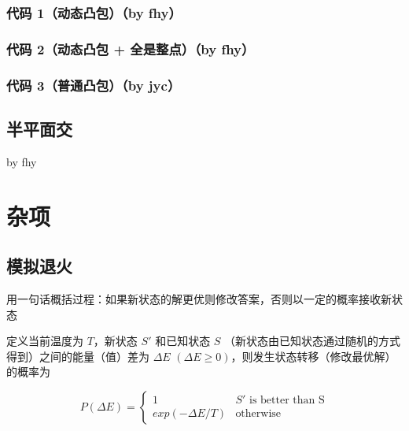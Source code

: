 \documentclass[12pt]{article}
\begin{document}
\subsubsection{代码 1（动态凸包）（by fhy）}



\newpage

\subsubsection{代码 2（动态凸包 + 全是整点）（by fhy）}



\newpage

\subsubsection{代码 3（普通凸包）（by jyc）}



\newpage

\subsection{半平面交}

by fhy



\newpage

{\centering\section{杂项}}

\subsection{模拟退火}

    \hspace{2em} 用一句话概括过程：如果新状态的解更优则修改答案，否则以一定的概率接收新状态

    \hspace{2em} 定义当前温度为 $T$，新状态 $S'$ 和已知状态 $S$ （新状态由已知状态通过随机的方式得到）之间的能量（值）差为 $\Delta E$ $(\Delta E\ge0)$，则发生状态转移（修改最优解）的概率为

$$
P(\Delta E)=
\begin{cases}
	1 & S'\text{ is better than S}\\
	exp(-\Delta E/T) & \text{otherwise}
\end{cases}
$$
\end{document}
